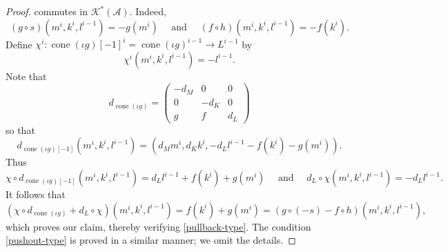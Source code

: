 \documentclass[11pt]{article}
\theoremstyle{thmstyle}
\theoremstyle{defstyle}
\newcommand{\scrA}{\mathscr{A}}
\newcommand{\scrK}{\mathscr{K}}
\newcommand{\cone}{\operatorname{cone}}
\begin{document}
\begin{proof}
	commutes in $\scrK^\ast(\scrA)$. Indeed, 
	\begin{equation*}
		\left(g\circ s\right)\left(m^i, k^i, l^{i - 1}\right) = -g\left(m^i\right)\quad\text{ and }\quad \left(f\circ h\right)\left(m^i, k^i, l^{i - 1}\right) = -f\left(k^i\right).
	\end{equation*}
	Define $\chi^i\colon\cone(\iota g)[-1]^i = \cone(\iota g)^{i - 1}\to L^{i - 1}$ by 
	\begin{equation*}
		\chi^i\left(m^i, k^i, l^{i - 1}\right) = -l^{i - 1}.
	\end{equation*}
	Note that 
	\begin{equation*}
		d_{\cone(\iota g)} = 
		\begin{pmatrix}
			-d_M & 0 & 0\\
			0 & -d_K & 0\\
			g & f & d_L
		\end{pmatrix}
	\end{equation*}
	so that 
	\begin{equation*}
		d_{\cone(\iota g)[-1]}\left(m^i, k^i, l^{i - 1}\right) = \left(d_M m^i, d_K k^i, -d_Ll^{i - 1} - f(k^i) - g(m^i)\right).
	\end{equation*}
	Thus 
	\begin{equation*}
		\chi\circ d_{\cone(\iota g)[-1]}\left(m^i, k^i, l^{i - 1}\right) = d_Ll^{i - 1} + f(k^i) + g(m^i)\quad\text{ and }\quad d_L\circ\chi\left(m^i, k^i, l^{i - 1}\right) = -d_L l^{i - 1}.
	\end{equation*}
	It follows that 
	\begin{equation*}
		\left(\chi\circ d_{\cone(\iota g)} + d_L\circ\chi\right)\left(m^i, k^i, l^{i - 1}\right) = f(k^i) + g(m^i) = \left(g\circ(-s) - f\circ h\right)\left(m^i, k^i, l^{i - 1}\right),
	\end{equation*}
	which proves our claim, thereby verifying \ref{pullback-type}. The condition \ref{pushout-type} is proved in a similar manner; we omit the details.


\end{proof}
\end{document}
